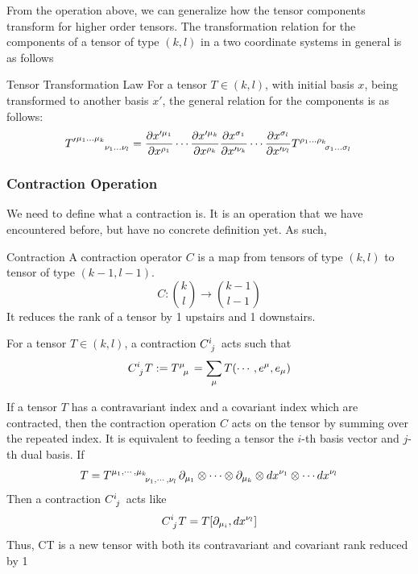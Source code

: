 	From the operation above, we can generalize how the tensor components 
	transform for higher order tensors. The transformation relation for the components of a tensor of type $(k,l)$ in a two coordinate systems in general is as follows
	\begin{theorem}{Tensor Transformation Law}
		For a tensor $T\in(k,l)$, with initial basis $x$, being transformed to another 
		basis $x'$, the general relation for the components is as follows:
		\begin{equation}
			\label{eq:tensor-transformation-law}
			{T'}\indices{^{{\mu_1}\ldots{\mu_k}}_{{\nu_1}\ldots{\nu_l}}}
			=
			\pdv{x'^{\mu_1}}{x^{\rho_1}} 
			\cdots
			\pdv{x'^{\mu_k}}{x^{\rho_k}} 
			\pdv{x^{\sigma_1}}{x'^{\nu_k}} 
			\cdots
			\pdv{x^{\sigma_l}}{x'^{\nu_l}} 
			\tensor{T}{^{{\rho_1}\ldots{\rho_k}}_{{\sigma_1}\ldots{\sigma_l}}}
		\end{equation}
	    
	\end{theorem}
	

\subsubsection{Contraction Operation}
	We need to define what a contraction is. It is an operation that we have encountered before, but 
	have no concrete definition yet. As such,
	
	\begin{definition}{Contraction}
		A contraction operator $C$ is a map from tensors of type $(k,l)$ to tensor
		of type $(k-1,l-1)$.
		\[
			C:\binom{k}{l}\to \binom{k-1}{l-1}
		\]
		It reduces the rank of a tensor by 1 upstairs and 1 downstairs. 
		
		For a tensor $T\in(k,l)$, a contraction $\tensor{C}{^i_j}$ acts
		such that
		\[
			\tensor{C}{^i_j}T:= \tensor{T}{^\mu_\mu} = \sum_\mu T(\cdots, e^\mu,e_\mu)
		\]
	\end{definition}
	If a tensor $T$ has a contravariant index and a covariant index
	which are contracted, then the contraction operation $C$ acts on
	the tensor by summing over the repeated index. It is equivalent to feeding 
	a tensor the $i$-th basis vector and $j$-th dual basis.
	If 
	\[
		T = \tensor{T}{^{\mu_1,\cdots,\mu_k}_{\nu_1,\cdots,\nu_l}}
		\p_{\mu_1}\otimes\cdots\otimes\p_{\mu_k}\otimes\dd{x^{\nu_1}}\otimes\cdots\dd{x^{\nu_l}}
	\]
	Then a contraction $\tensor{C}{^i_j}$ acts like
	\[
		\tensor{C}{^i_j}T = T[\p_{\mu_i},\dd{x^{\nu_l}}]
	\]
	Thus, CT is a new tensor with both its contravariant and covariant
	rank reduced by 1
	
